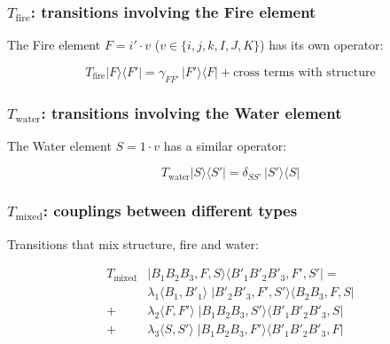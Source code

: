 \documentclass[11pt]{article}
\begin{document}
\hypertarget{t_textfire-transitions-involving-the-fire-element}{%
\subsubsection{\texorpdfstring{\(T_{\text{fire}}\): transitions
involving the Fire
element}{T\_\{\textbackslash text\{fire\}\}: transitions involving the Fire element}}\label{t_textfire-transitions-involving-the-fire-element}}

The Fire element \(F = i'\cdot v\) (\(v\in\{i,j,k,I,J,K\}\)) has its own
operator:

\[
T_{\text{fire}} |F\rangle\langle F'| = \gamma_{FF'}\, |F'\rangle\langle F| + \text{cross terms with structure}
\]

\hypertarget{t_textwater-transitions-involving-the-water-element}{%
\subsubsection{\texorpdfstring{\(T_{\text{water}}\): transitions
involving the Water
element}{T\_\{\textbackslash text\{water\}\}: transitions involving the Water element}}\label{t_textwater-transitions-involving-the-water-element}}

The Water element \(S = 1\cdot v\) has a similar operator:

\[
T_{\text{water}} |S\rangle\langle S'| = \delta_{SS'}\, |S'\rangle\langle S|
\]

\hypertarget{t_textmixed-couplings-between-different-types}{%
\subsubsection{\texorpdfstring{\(T_{\text{mixed}}\): couplings between
different
types}{T\_\{\textbackslash text\{mixed\}\}: couplings between different types}}\label{t_textmixed-couplings-between-different-types}}

Transitions that mix structure, fire and water:

\[
\begin{aligned}
T_{\text{mixed}} &|B_1B_2B_3,F,S\rangle\langle B'_1B'_2B'_3,F',S'| = \\
&\lambda_1 \langle B_1,B'_1\rangle \; |B'_2B'_3,F',S'\rangle\langle B_2B_3,F,S| \\
+&\lambda_2 \langle F,F'\rangle \; |B_1B_2B_3,S'\rangle\langle B'_1B'_2B'_3,S| \\
+&\lambda_3 \langle S,S'\rangle \; |B_1B_2B_3,F'\rangle\langle B'_1B'_2B'_3,F|
\end{aligned}
\]
\end{document}

